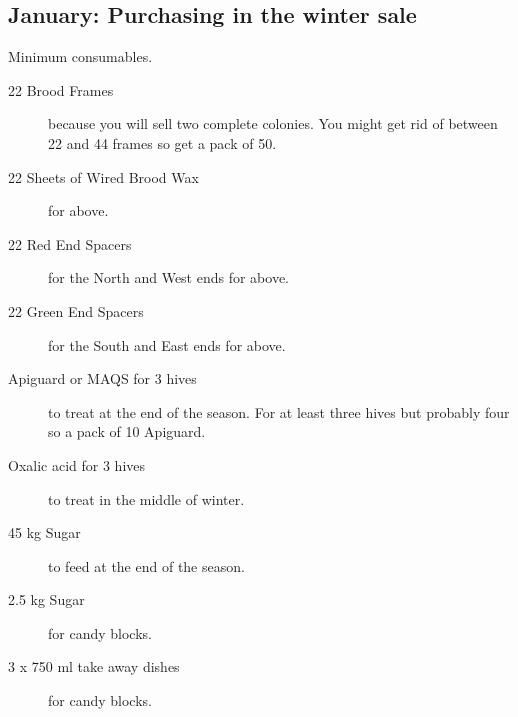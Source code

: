 \subsection{January: Purchasing in the winter sale}

Minimum consumables.

\begin{description}
    \item[22 Brood Frames] because you will sell two complete colonies.
      You might get rid of between 22 and 44 frames so get a pack of 50.
    \item[22 Sheets of Wired Brood Wax] for above.
    \item[22 Red End Spacers] for the North and West ends for above.
    \item[22 Green End Spacers] for the South and East ends for above.
    \item[Apiguard or MAQS for 3 hives] to treat at the end of the season.
      For at least three hives but probably four so a pack of 10 Apiguard.
    \item[Oxalic acid for 3 hives] to treat in the middle of winter.
    \item[45 kg Sugar] to feed at the end of the season.
    \item[2.5 kg Sugar] for candy blocks.
    \item[3 x 750 ml take away dishes] for candy blocks.
\end{description}

